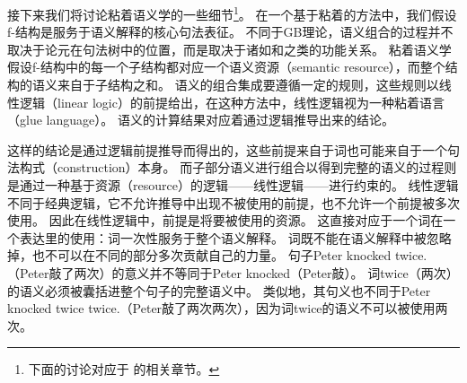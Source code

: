 接下来我们将讨论粘着语义学的一些细节\footnote{%
下面的讨论对应于 的相关章节。
}。
在一个基于粘着的方法中，我们假设f-结构是服务于语义解释的核心句法表征。
不同于GB理论，语义组合的过程并不取决于论元在句法树中的位置，而是取决于诸如\lfgsubj 和\lfgobj 之类的功能关系。 
粘着语义学假设f-结构中的每一个子结构都对应一个语义资源（semantic resource），而整个结构的语义来自于子结构之和。
语义的组合集成要遵循一定的规则，这些规则以线性逻辑（linear logic）的前提给出，在这种方法中，线性逻辑视为一种粘着语言（glue language）。
语义的计算结果对应着通过逻辑推导出来的结论。

这样的结论是通过逻辑前提推导而得出的，这些前提来自于词也可能来自于一个句法构式（construction）本身。
而子部分语义进行组合以得到完整的语义的过程则是通过一种基于资源（resource）的逻辑——线性逻辑——进行约束的。
线性逻辑不同于经典逻辑，它不允许推导中出现不被使用的前提，也不允许一个前提被多次使用。
因此在线性逻辑中，前提是将要被使用的资源。
这直接对应于一个词在一个表达里的使用：词一次性服务于整个语义解释。
词既不能在语义解释中被忽略掉，也不可以在不同的部分多次贡献自己的力量。
句子Peter knocked twice.（Peter敲了两次）的意义并不等同于Peter knocked（Peter敲）。
词twice（两次）的语义必须被囊括进整个句子的完整语义中。
类似地，其句义也不同于Peter knocked twice twice.（Peter敲了两次两次），因为词twice的语义不可以被使用两次。

